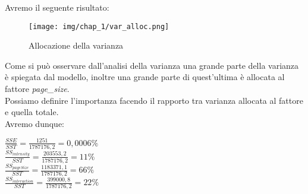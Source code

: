 Avremo il seguente risultato:
\begin{figure}[H]
    \centering
    \texttt{[image: img/chap\_1/var\_alloc.png]}
    \caption{Allocazione della varianza}
    \label{fig:var_alloc}
\end{figure}
\noindent
Come si può osservare dall'analisi della varianza una grande parte della varianza è spiegata dal modello, inoltre una grande parte di quest'ultima è allocata al fattore \textit{page\_size}.\\
Possiamo definire l'importanza facendo il rapporto tra varianza allocata al fattore e quella totale.\\
Avremo dunque:
\begin{center}
    
    $\frac{SSE}{SST} = \frac{1251}{1787176,2} = 0,0006\% $\\
    $\frac{SS_{intensity}}{SST} = \frac{203553,2}{1787176,2} = 11\%$ \\
    $\frac{SS_{pageSize}}{SST} = \frac{1183371,1}{1787176,2}=66\%$ \\
    $\frac{SS_{interaction}}{SST} = \frac{399000,8}{1787176,2}=22\% $
    
\end{center}

